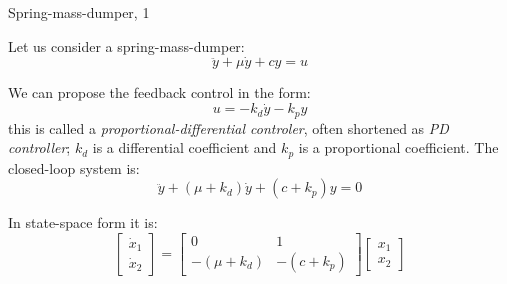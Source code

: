 \documentclass{beamer}
\begin{document}
\begin{frame}{Spring-mass-dumper, 1}
	\begin{flushleft}
		
		Let us consider a spring-mass-dumper:
		\begin{equation}
			\ddot y + \mu \dot y + c y = u
		\end{equation}
		
		We can propose the feedback control in the form:
		\begin{equation}
			u = -k_d \dot y  -k_p y 
		\end{equation}
		this is called a \emph{proportional-differential controler}, often shortened as \emph{PD controller}; $k_d$ is a differential coefficient and $k_p$ is a proportional coefficient. The closed-loop system is:
		\begin{equation}
			\ddot y + (\mu + k_d) \dot y + (c+k_p) y = 0
		\end{equation}
		
		
		In state-space form it is:
		\begin{equation}
			\begin{bmatrix}
				\dot x_1 \\ \dot x_2
			\end{bmatrix} 
			= 
			\begin{bmatrix}
				0 & 1 \\ -(\mu + k_d) & -(c+k_p)
			\end{bmatrix}
			\begin{bmatrix}
				x_1 \\ x_2
			\end{bmatrix}
		\end{equation}
		
		
		
	\end{flushleft}
\end{frame}
\end{document}
